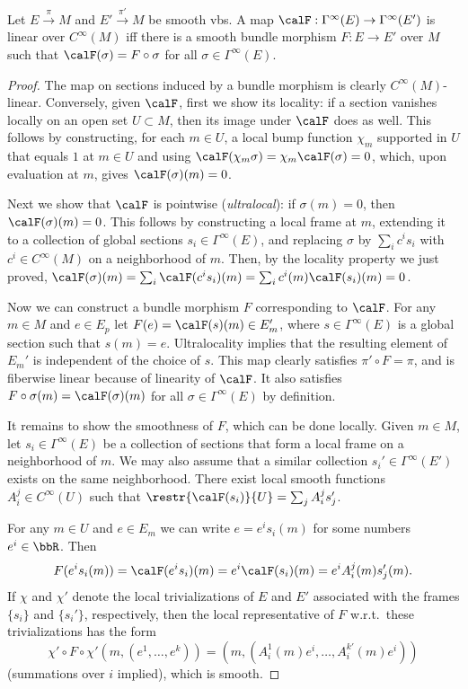 \begin{lem}
    Let $E\overset{\pi}{\to}M$ and $E'\overset{\pi'}{\to}M$ be smooth \glspl{vb}. A map $\calF:\Gamma^\infty(E)\to \Gamma^\infty(E')$ is linear over $C^\infty(M)$ iff there is a smooth bundle morphism $F:E\to E'$ over $M$ such that $\calF(\sigma)=F\circ\sigma$ for all $\sigma\in\Gamma^\infty(E)$.
\end{lem}
\begin{proof}
    The map on sections induced by a bundle morphism is clearly $C^\infty(M)$-linear. Conversely, given $\calF$, first we show its locality: if a section vanishes locally on an open set $U\subset M$, then its image under $\calF$ does as well. This follows by constructing, for each $m\in U$, a local bump function $\chi_m$ supported in $U$ that equals $1$ at $m\in U$ and using  $\calF(\chi_m\sigma)=\chi_m\calF(\sigma)=0$, which, upon evaluation at $m$, gives $\calF(\sigma)(m)=0$.

    Next we show that $\calF$ is pointwise (\emph{ultralocal}): if $\sigma(m)=0$, then $\calF(\sigma)(m)=0$. This follows by constructing a local frame at $m$, extending it to a collection of global sections $s_i\in\Gamma^\infty(E)$, and replacing $\sigma$ by $\sum_i c^is_i$ with $c^i\in C^\infty(M)$ on a neighborhood of $m$. Then, by the locality property we just proved, $\calF(\sigma)(m)=\sum_i\calF(c^is_i)(m)=\sum_i c^i(m)\calF(s_i)(m)=0$.

    Now we can construct a bundle morphism $F$ corresponding to $\calF$. For any $m\in M$ and $e\in E_p$ let $F(e)=\calF(s)(m)\in E'_m$, where $s\in \Gamma^\infty(E)$ is a global section such that $s(m)=e$. Ultralocality implies that the resulting element of $E_m'$ is independent of the choice of $s$. This map clearly satisfies $\pi'\circ F=\pi$, and is fiberwise linear because of linearity of $\calF$. It also satisfies $F\circ\sigma(m)=\calF(\sigma)(m)$ for all $\sigma\in\Gamma^\infty(E)$ by definition. 

    It remains to show the smoothness of $F$, which can be done locally. Given $m\in M$, let $s_i\in\Gamma^\infty(E)$ be a collection of sections that form a local frame on a neighborhood of $m$. We may also assume that a similar collection $s_i'\in\Gamma^\infty(E')$ exists on the same neighborhood. There exist local smooth functions $A_i^j\in C^\infty(U)$ such that $\restr{\calF(s_i)}{U}=\sum_j A_i^j s_j'$.

    For any $m\in U$ and $e\in E_m$ we can write $e=e^is_i(m)$ for some numbers $e^i\in\bbR$. Then 
    \[F(e^is_i(m))=\calF(e^is_i)(m)=e^i\calF(s_i)(m)=e^i A_i^j(m)s_j'(m).\]
    If $\chi$ and $\chi'$ denote the local trivializations of $E$ and $E'$ associated with the frames $\{s_i\}$ and $\{s_i'\}$, respectively, then the local representative of $F$ w.r.t.\ these trivializations has the form 
    \[\chi'\circ F\circ\chi'(m,(e^1,\ldots,e^k))=(m,(A_i^1(m)e^i,\ldots,A_i^{k'}(m)e^i))\]
    (summations over $i$ implied), which is smooth.
\end{proof}



